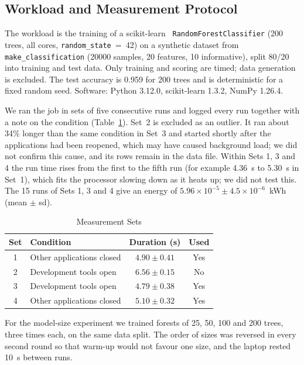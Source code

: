 \documentclass[conference]{IEEEtran}
\begin{document}
\subsection{Workload and Measurement Protocol}

The workload is the training of a scikit-learn~\cite{pedregosa2011sklearn} \texttt{RandomForestClassifier} (200 trees, all cores, \texttt{random\_state}~=~42) on a synthetic dataset from \texttt{make\_classification} (\num{20000} samples, 20 features, 10 informative), split 80/20 into training and test data. Only training and scoring are timed; data generation is excluded. The test accuracy is 0.959 for 200 trees and is deterministic for a fixed random seed. Software: Python 3.12.0, scikit-learn 1.3.2, NumPy 1.26.4.

We ran the job in sets of five consecutive runs and logged every run together with a note on the condition (Table~\ref{tab:sets}). Set~2 is excluded as an outlier. It ran about 34\% longer than the same condition in Set~3 and started shortly after the applications had been reopened, which may have caused background load; we did not confirm this cause, and its rows remain in the data file. Within Sets 1, 3 and 4 the run time rises from the first to the fifth run (for example 4.36~s to 5.30~s in Set~1), which fits the processor slowing down as it heats up; we did not test this. The 15 runs of Sets 1, 3 and 4 give an energy of $5.96\times10^{-5} \pm 4.5\times10^{-6}$~kWh (mean $\pm$ sd).

\begin{table}[t]
\caption{Measurement Sets}
\label{tab:sets}
\centering
\footnotesize
\begin{tabular}{@{}clcc@{}}
\toprule
Set & Condition & Duration (s) & Used \\
\midrule
1 & Other applications closed & $4.90 \pm 0.41$ & Yes \\
2 & Development tools open    & $6.56 \pm 0.15$ & No  \\
3 & Development tools open    & $4.79 \pm 0.38$ & Yes \\
4 & Other applications closed & $5.10 \pm 0.32$ & Yes \\
\bottomrule
\end{tabular}
\end{table}

For the model-size experiment we trained forests of 25, 50, 100 and 200 trees, three times each, on the same data split. The order of sizes was reversed in every second round so that warm-up would not favour one size, and the laptop rested 10~s between runs.
\end{document}
